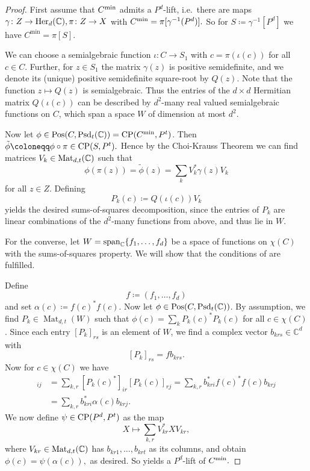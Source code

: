 \documentclass[11pt,onecolumn]{article}
\theoremstyle{plain}
\theoremstyle{definition}
\newcommand{\C}{\mathbb{C}}
\begin{document}
\begin{proof}
	First assume that \(C^\textnormal{min}\) admits a \(P^d\)-lift, i.e.\ there are  maps $\gamma\colon Z\to {\rm Her}_d(\C), \pi\colon Z\to X$ with $C^{\rm min}=\pi[\gamma^{-1}(P^d)].$  So for  $S\coloneqq \gamma^{-1}[P^d]$ we have  $C^{\min}=\pi[S].$   
 
    We can choose a semialgebraic function $\iota\colon C\to S_1$ with $c=\pi(\iota(c))$ for all $c\in C$.  Further, for $z\in S_1$ the matrix $\gamma(z)$ is positive semidefinite, and we denote its (unique) positive semidefinite  square-root by \(Q(z)\). Note that the function $z\mapsto Q(z)$ is semialgebraic. Thus the entries of the $d\times d$ Hermitian matrix $Q(\iota(c))$ can be described by $d^2$-many real valued semialgebraic functions on $C$, which span a space $W$ of dimension at most $d^2$.

    Now let \(\phi \in {\rm Pos}(C,{\rm Psd}_t(\C))={\rm CP}(C^{\rm min},P^t)\). Then  \(\tilde{\phi} \coloneqq \phi \circ \pi\in{\rm CP}(S,P^t).\)  Hence by the Choi-Krauss Theorem  we can find matrices \(V_k\in{\rm Mat}_{d,t}(\C)\) such that  \ \[\phi(\pi(z)) = \tilde{\phi}(z) = \sum_k V_k^* \gamma(z) V_k\] for all $z\in Z$.
     Defining \[P_k(c) \coloneqq Q(\iota(c)) V_k\] yields the desired sums-of-squares decomposition, since the entries of $P_k$ are linear combinations of the $d^2$-many functions from above, and thus lie in $W.$
	
	For the converse, let $W = {\rm span}_\C\{f_1, \dots, f_d\}$ be a space of functions on $\chi(C)$ with the sums-of-squares property. We will show that the conditions of  are fulfilled. 
 
    Define \[f \coloneqq \left(f_1, \dots, f_d\right)\] and set \(\alpha(c) \coloneqq f(c)^*f(c)\). Now let $\phi \in {\rm Pos}(C,{\rm Psd}_t(\C))$. By assumption, we find \(P_k \in \operatorname{Mat}_{d,t}(W)\) such that \(\phi(c) = \sum_k P_k(c)^* P_k(c)\) for all $c\in\chi(C)$. Since each entry \([P_k]_{rs}\) is an element of \(W\), we find a complex vector \(b_{krs}\in\C^d\) with \[[P_k]_{rs} = fb_{krs}.\]   Now for \(c \in \chi(C)\) we have
    \begin{align*}[\phi(c)]_{ij} &= \sum_{k,r} [P_k(c)^*]_{ir}[P_k(c)]_{rj} = \sum_{k,r} b_{kri}^*f(c)^*f(c)b_{krj}\\ &=\sum_{k,r} b_{kri}^*\alpha(c)b_{krj}.\end{align*}
    We now define $\psi\in{\rm CP}(P^d,P^t)$ as the map \[X \mapsto \sum_{k,r} V_{kr}^* X V_{kr},\] where $V_{kr}\in{\rm Mat}_{d,t}(\C)$ has $b_{kr1},\ldots, b_{kr
     t}$ as its columns, and obtain $\phi(c)=\psi(\alpha(c)),$ as desired. So  yields a $P^d$-lift of $C^{\rm min}.$
\end{proof}
\end{document}
